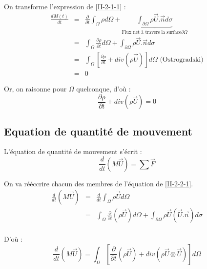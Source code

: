 On transforme l'expression de \ref{II-2-1-1} :
\begin{eqnarray*}
	\frac{d M(t)}{dt}&=&\frac{\partial}{\partial t} \int_{\Omega} \rho d\Omega + \underbrace{\int_{\partial\Omega} \rho \overrightarrow{U}.\overrightarrow{n} d\sigma}_{\text{Flux net à travers la surface} \partial\Omega}\\
			&=& \int_{\Omega} \frac{\partial \rho}{\partial t} d\Omega + \int_{\partial \Omega} \rho \overrightarrow{U}.\overrightarrow{n} d\sigma \\
			&=& \int_{\Omega} \left[ \frac{\partial \rho}{\partial t} + div\left(\rho \overrightarrow{U}\right)\right] d\Omega \text{ (Ostrogradski)}\\
			&=& 0
\end{eqnarray*}

Or, on raisonne pour $\Omega$ quelconque, d'où :
	\begin{equation} \label{II-2-1-2} \frac{\partial \rho}{\partial t} + div\left(\rho \overrightarrow{U}\right)=0 \end{equation}

	\subsection{Equation de quantité de mouvement}
L'équation de quantité de mouvement s'écrit :
	\begin{equation} \label{II-2-2-1} \frac{d}{dt} \left( M\overrightarrow{U}\right) =\sum \overrightarrow{F} \end{equation}

On va rééccrire chacun des membres de l'équation de \ref{II-2-2-1}. 
\begin{eqnarray*}
	\frac{d}{dt} \left(M\overrightarrow{U}\right) &=& \frac{d}{dt} \int_{\Omega} \rho \overrightarrow{U} d\Omega \\
							&=& \int_{\Omega} \frac{\partial}{\partial t} \left( \rho \overrightarrow{U} \right) d\Omega + \int_{\partial \Omega} \rho \overrightarrow{U}\left(\overrightarrow{U}.\overrightarrow{n}\right) d\sigma \\
\end{eqnarray*}

D'où :
\begin{equation} \frac{d}{dt} \left(M\overrightarrow{U}\right)= \int_{\Omega} \left[ \frac{\partial}{\partial t} \left( \rho \overrightarrow{U} \right) + div\left( \rho \overrightarrow{U}\otimes \overrightarrow{U}\right)\right] d\Omega \label{II-2-2-2} \end{equation}

